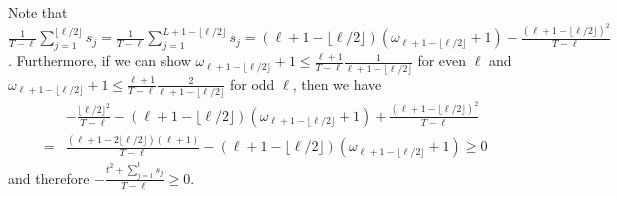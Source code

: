 			Note that $\frac{1}{T - \ell} \sum_{j=1}^{\lfloor \ell/2 \rfloor} s_j = \frac{1}{T - \ell} \sum_{j = 1}^{L +1 - \lfloor \ell/2 \rfloor} s_j = (\ell+1 - \lfloor \ell/2 \rfloor ) (\omega_{\ell+1 - \lfloor \ell/2 \rfloor} +1) - \frac{(\ell+1- \lfloor \ell/2 \rfloor )^2}{T - \ell}$. Furthermore, if we can show  $\omega_{\ell+1 - \lfloor \ell/2 \rfloor} +1 \leq \frac{\ell+1}{T - \ell} \frac{1}{\ell+1 - \lfloor \ell/2\rfloor}$ for even $\ell$ and $\omega_{\ell+1 - \lfloor \ell/2 \rfloor} +1 \leq \frac{\ell+1}{T - \ell} \frac{2}{\ell+1 - \lfloor \ell/2\rfloor}$ for odd $\ell$, then we have 
			\begin{eqnarray*}
				&& - \frac{\lfloor \ell/2 \rfloor^2}{T - \ell} - (\ell+1 - \lfloor \ell/2 \rfloor ) (\omega_{\ell+1 - \lfloor \ell/2 \rfloor} +1) + \frac{(\ell+1- \lfloor \ell/2 \rfloor )^2}{T - \ell} \\
				&=& \frac{(\ell+1- 2\lfloor \ell/2 \rfloor) (\ell+1)}{T - \ell} - (\ell+1 - \lfloor \ell/2 \rfloor ) (\omega_{\ell+1 - \lfloor \ell/2 \rfloor} +1) \geq 0
			\end{eqnarray*}
			and therefore $-\frac{t^2 + \sum_{j=1}^t s_j}{T - \ell} \geq 0$.
			
